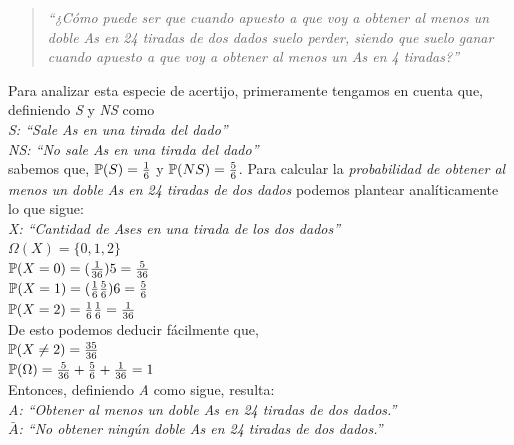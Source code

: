 \documentclass{article}
\begin{document}
\begin{quotation}
\em``¿Cómo puede ser que cuando apuesto a que voy a obtener al menos un doble As en 24 tiradas de dos dados suelo perder, siendo que suelo ganar cuando apuesto a que voy a obtener al menos un As en 4 tiradas?''
\end{quotation}

\noindent Para analizar esta especie de acertijo, primeramente tengamos en cuenta que, definiendo \textit{S} y \textit{NS} como\\

\indent \textit{S: ``Sale As en una tirada del dado''}\\
\indent \textit{NS: ``No sale As en una tirada del dado''}\\

\noindent sabemos que, $\mathbb{P}(S) = {1 \over 6}$ y $\mathbb{P}(NS) = {5 \over 6}$. 
Para calcular la \textit{probabilidad de obtener al menos un doble As en 24 tiradas de dos dados} podemos plantear analíticamente lo que sigue:\\

\indent \textit{X: ``Cantidad de Ases en una tirada de los dos dados''}\\
\indent $\Omega(X) = \{0,1,2\}$ \\

\indent $\mathbb{P}(X=0) = ({1 \over 36})5 = {5 \over 36}$ \medskip\\
\indent $\mathbb{P}(X=1) = ({1 \over 6}{5 \over 6})6 = {5 \over 6}$ \medskip\\
\indent $\mathbb{P}(X=2) = {1 \over 6}{1 \over 6} = {1 \over 36}$ \medskip\\

\noindent De esto podemos deducir fácilmente que,\\

\indent $\mathbb{P}(X \neq 2) = {35 \over 36}$ \medskip\\
\indent $\mathbb{P}(\Omega) = {5 \over 36} + {5 \over 6} + {1 \over 36} = 1$ \medskip\\

\noindent Entonces, definiendo \textit{A} como sigue, resulta:\\

\indent \textit{A: ``Obtener al menos un doble As en 24 tiradas de dos dados.''}\\
\indent \textit{$\bar{A}$: ``No obtener ningún doble As en 24 tiradas de dos dados.''}\\
\end{document}
